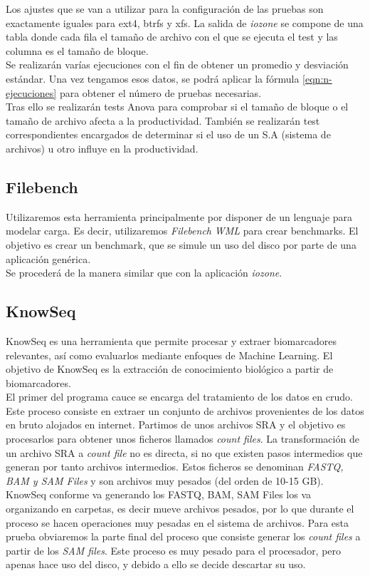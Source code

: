 Los ajustes que se van a utilizar para la configuración de las pruebas son exactamente iguales para ext4, btrfs y xfs. La salida de \textit{iozone} se compone de una tabla donde cada fila el tamaño de archivo con el que se ejecuta el test y las columna es el tamaño de bloque. \\

Se realizarán varías ejecuciones con el fin de obtener un promedio y desviación estándar. Una vez tengamos esos datos, se podrá aplicar la fórmula \ref{eqn:n-ejecuciones} para obtener el número de pruebas necesarias.\\

Tras ello se realizarán tests Anova para comprobar si el tamaño de bloque o el tamaño de archivo afecta a la productividad. También se realizarán test correspondientes encargados de determinar si el uso de un S.A (sistema de archivos) u otro influye en la productividad.



\subsection{Filebench}
Utilizaremos esta herramienta principalmente por disponer de un lenguaje para modelar carga. Es decir, utilizaremos \textit{Filebench} \textit{WML} para crear benchmarks. El objetivo es crear un benchmark, que se simule un uso del disco por parte de una aplicación genérica.\\

Se procederá de la manera similar que con la aplicación \textit{iozone}.


\subsection{KnowSeq}\label{metodologia_knowseq}
KnowSeq es una herramienta que permite procesar y extraer biomarcadores relevantes, así como evaluarlos mediante enfoques de Machine Learning. El objetivo de KnowSeq es la extracción de conocimiento biológico a partir de biomarcadores. \\

El primer del programa cauce se encarga del tratamiento de los datos en crudo. Este proceso consiste en extraer un conjunto de archivos provenientes de los datos en bruto alojados en internet. Partimos de unos archivos SRA y el objetivo es procesarlos para obtener unos ficheros llamados \textit{count files}. La transformación de un archivo SRA a \textit{count file} no es directa, si no que existen pasos intermedios que generan por tanto archivos intermedios. Estos ficheros se denominan \textit{FASTQ, BAM y SAM Files} y son archivos muy pesados (del orden de 10-15 GB). KnowSeq conforme va generando los FASTQ, BAM, SAM Files los va organizando en carpetas, es decir mueve archivos pesados, por lo que durante el proceso se hacen operaciones muy pesadas en el sistema de archivos. Para esta prueba obviaremos la parte final del proceso que consiste generar los \textit{count files} a partir de los \textit{SAM files}. Este proceso es muy pesado para el procesador, pero apenas hace uso del disco, y debido a ello se decide descartar su uso.\\


